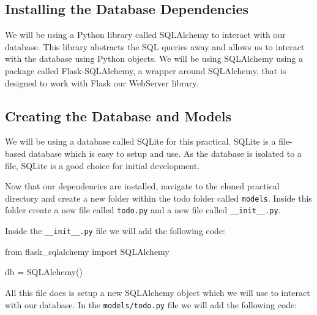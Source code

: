 \documentclass{csse4400}
\begin{document}

\subsection{Installing the Database Dependencies}

We will be using a Python library called SQLAlchemy to interact with our database.
This library abstracts the SQL queries away and allows us to interact with the database using Python objects.
We will be using SQLAlchemy using a package called Flask-SQLAlchemy, a wrapper around SQLAlchemy,
that is designed to work with Flask our WebServer library.


\subsection{Creating the Database and Models}

We will be using a database called SQLite for this practical.
SQLite is a file-based database which is easy to setup and use.
As the database is isolated to a file, SQLite is a good choice for initial development.

Now that our dependencies are installed,
navigate to the cloned practical directory and create a new folder within the todo folder called \texttt{models}.
Inside this folder create a new file called \texttt{todo.py} and a new file called \texttt{\_\_init\_\_.py}.

Inside the \texttt{\_\_init\_\_.py} file we will add the following code:

\begin{code}[language=python,numbers=none]{}
  from flask_sqlalchemy import SQLAlchemy

  db = SQLAlchemy()
\end{code}

All this file does is setup a new SQLAlchemy object which we will use to interact with our database.
In the \texttt{models/todo.py} file we will add the following code:
\end{document}
